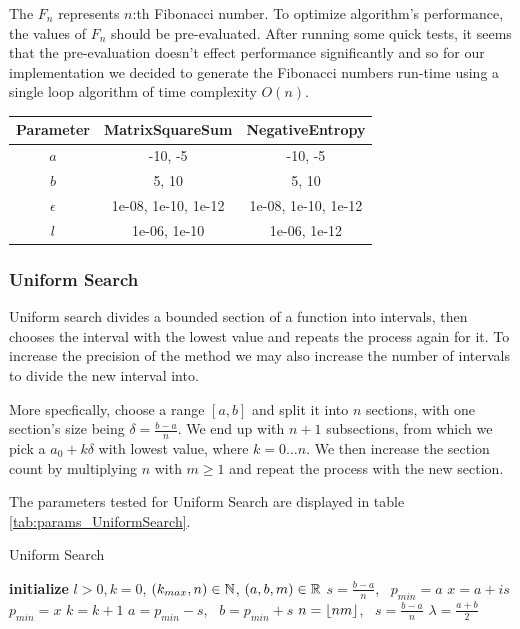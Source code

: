 \documentclass[a4paper,english,titlepage,12pt]{article}
\newcommand{\floor}[1]{\ensuremath\lfloor#1\rfloor}
\newcommand{\R}{\ensuremath\mathbb{R}}
\newcommand{\N}{\ensuremath\mathbb{N}}
\begin{document}
The $F_n$ represents $n$:th Fibonacci number. To optimize algorithm's performance, the values of $F_n$ should be pre-evaluated. After running some quick tests, it seems that the pre-evaluation doesn't effect performance significantly and so for our implementation we decided to generate the Fibonacci numbers run-time using a single loop algorithm of time complexity $O(n)$. 

\begin{table}[H]
\label{tab:params_FibonacciSearch}
\centering
{}
\begin{tabular}{|c|c|c|}
\hline
\rowcolor{gray!25}
Parameter & MatrixSquareSum & NegativeEntropy \\
\hline
$a$ & -10, -5 & -10, -5 \\
$b$ & 5, 10 & 5, 10 \\
$\epsilon$ & 1e-08, 1e-10, 1e-12 & 1e-08, 1e-10, 1e-12 \\
$l$ & 1e-06, 1e-10 & 1e-06, 1e-12 \\
\hline
\end{tabular}
\end{table}


\subsubsection{Uniform Search}

Uniform search divides a bounded section of a function into intervals, then chooses the interval with the lowest value and repeats the process again for it. To increase the precision of the method we may also increase the number of intervals to divide the new interval into. \cite{book:nonlinear_programming}

More specfically, choose a range $[a, b]$ and split it into $n$ sections, with one section's size being $\delta = \frac{b - a}{n}$. We end up with $n + 1$ subsections, from which we pick a $a_0 + k \delta$ with lowest value, where $k = 0 \dots n$. We then increase the section count by multiplying $n$ with $m \geq 1$ and repeat the process with the new section. \cite{course_material_nonlinear_optimisation}

The parameters tested for Uniform Search are displayed in table \ref{tab:params_UniformSearch}.


\begin{algorithm}[H]
\caption{Uniform Search}
\label{alg_uniform}
\begin{algorithmic}[1]
\STATE \textbf{initialize} $l > 0, k = 0$, $(k_{max}, n) \in \N$, $(a, b, m) \in \R$
\STATE $s = \frac{b - a}{n}$, \ $p_{min} = a$
        \STATE $x = a + i s$
            \STATE $p_{min} = x$
        \ENDIF
        \STATE $k = k + 1$
    \ENDFOR
    \STATE $a = p_{min} - s$, \ $b = p_{min} + s$
    \STATE $n = \floor{n m}$, \ $s = \frac{b - a}{n}$
\ENDWHILE
\RETURN $\lambda = \frac{a + b}{2}$
\end{algorithmic}
\end{algorithm}
\end{document}
